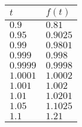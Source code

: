 \documentclass{standalone}
\begin{document}
\begin{tabular}{l | l}
  \(t\)      & \(f(t)\)  \\
  \midrule
  \(0.9\)    & \(0.81\)   \\
  \(0.95\)   & \(0.9025\) \\
  \(0.99\)   & \(0.9801\) \\
  \(0.999\)  & \(0.998\)  \\
  \(0.9999\) & \(0.9998\) \\
  \(1.0001\) & \(1.0002\) \\
  \(1.001\)  & \(1.002\)  \\
  \(1.01\)   & \(1.0201\) \\
  \(1.05\)   & \(1.1025\) \\
  \(1.1\)    & \(1.21\)   \\
\end{tabular}
\end{document}
